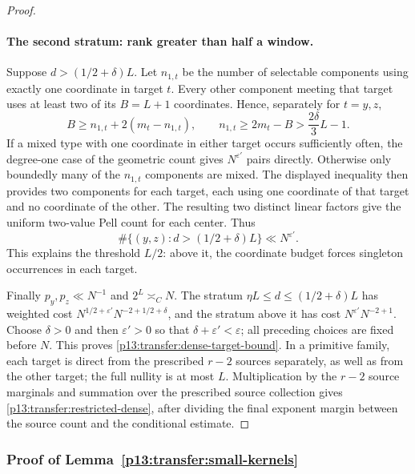 \begin{proof}
\paragraph{The second stratum: rank greater than half a window.}
Suppose $d>(1/2+\delta)L$. Let $n_{1,t}$ be the number of selectable
components using exactly one coordinate in target $t$. Every other
component meeting that target uses at least two of its $B=L+1$
coordinates. Hence, separately for $t=y,z$,
\[
 B\geq n_{1,t}+2(m_t-n_{1,t}),\qquad
 n_{1,t}\geq2m_t-B>\frac{2\delta}{3}L-1.
\]
If a mixed type with one coordinate in either target occurs sufficiently
often, the degree-one case of the geometric count gives
$N^{\varepsilon'}$ pairs directly. Otherwise only boundedly many of
the $n_{1,t}$ components are mixed. The displayed inequality then
provides two components for each target, each using one coordinate of
that target and no coordinate of the other. The resulting two distinct
linear factors give the uniform two-value Pell count for each center.
Thus
\[
 \#\{(y,z):d>(1/2+\delta)L\}\ll N^{\varepsilon'}.
\]
This explains the threshold $L/2$: above it, the coordinate budget
forces singleton occurrences in each target.

Finally $p_y,p_z\ll N^{-1}$ and $2^L\asymp_C N$.
The stratum $\eta L\leq d\leq(1/2+\delta)L$ has weighted cost
$N^{1/2+\varepsilon'}N^{-2+1/2+\delta}$, and the stratum above it
has cost $N^{\varepsilon'}N^{-2+1}$. Choose $\delta>0$ and then
$\varepsilon'>0$ so that $\delta+\varepsilon'<\varepsilon$;
all preceding choices are fixed before $N$. This proves
\eqref{p13:transfer:dense-target-bound}.
In a primitive family, each target is direct from the prescribed
$r-2$ sources separately, as well as from the other target; the full
nullity is at most $L$. Multiplication by the $r-2$ source marginals
and summation over the prescribed source collection gives
\eqref{p13:transfer:restricted-dense}, after dividing the final exponent
margin between the source count and the conditional estimate.
\end{proof}

\subsubsection{Proof of Lemma~\ref{p13:transfer:small-kernels}}
\label{p14:comp:transfer-small-kernels}

